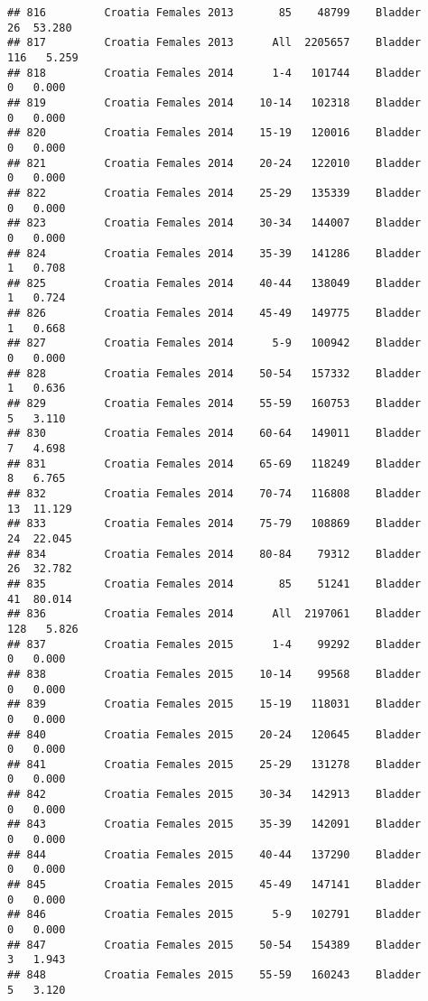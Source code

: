 \documentclass[
]{article}
\begin{document}
\begin{verbatim}
## 816         Croatia Females 2013       85    48799    Bladder     26  53.280
## 817         Croatia Females 2013      All  2205657    Bladder    116   5.259
## 818         Croatia Females 2014      1-4   101744    Bladder      0   0.000
## 819         Croatia Females 2014    10-14   102318    Bladder      0   0.000
## 820         Croatia Females 2014    15-19   120016    Bladder      0   0.000
## 821         Croatia Females 2014    20-24   122010    Bladder      0   0.000
## 822         Croatia Females 2014    25-29   135339    Bladder      0   0.000
## 823         Croatia Females 2014    30-34   144007    Bladder      0   0.000
## 824         Croatia Females 2014    35-39   141286    Bladder      1   0.708
## 825         Croatia Females 2014    40-44   138049    Bladder      1   0.724
## 826         Croatia Females 2014    45-49   149775    Bladder      1   0.668
## 827         Croatia Females 2014      5-9   100942    Bladder      0   0.000
## 828         Croatia Females 2014    50-54   157332    Bladder      1   0.636
## 829         Croatia Females 2014    55-59   160753    Bladder      5   3.110
## 830         Croatia Females 2014    60-64   149011    Bladder      7   4.698
## 831         Croatia Females 2014    65-69   118249    Bladder      8   6.765
## 832         Croatia Females 2014    70-74   116808    Bladder     13  11.129
## 833         Croatia Females 2014    75-79   108869    Bladder     24  22.045
## 834         Croatia Females 2014    80-84    79312    Bladder     26  32.782
## 835         Croatia Females 2014       85    51241    Bladder     41  80.014
## 836         Croatia Females 2014      All  2197061    Bladder    128   5.826
## 837         Croatia Females 2015      1-4    99292    Bladder      0   0.000
## 838         Croatia Females 2015    10-14    99568    Bladder      0   0.000
## 839         Croatia Females 2015    15-19   118031    Bladder      0   0.000
## 840         Croatia Females 2015    20-24   120645    Bladder      0   0.000
## 841         Croatia Females 2015    25-29   131278    Bladder      0   0.000
## 842         Croatia Females 2015    30-34   142913    Bladder      0   0.000
## 843         Croatia Females 2015    35-39   142091    Bladder      0   0.000
## 844         Croatia Females 2015    40-44   137290    Bladder      0   0.000
## 845         Croatia Females 2015    45-49   147141    Bladder      0   0.000
## 846         Croatia Females 2015      5-9   102791    Bladder      0   0.000
## 847         Croatia Females 2015    50-54   154389    Bladder      3   1.943
## 848         Croatia Females 2015    55-59   160243    Bladder      5   3.120

\end{verbatim}
\end{document}
